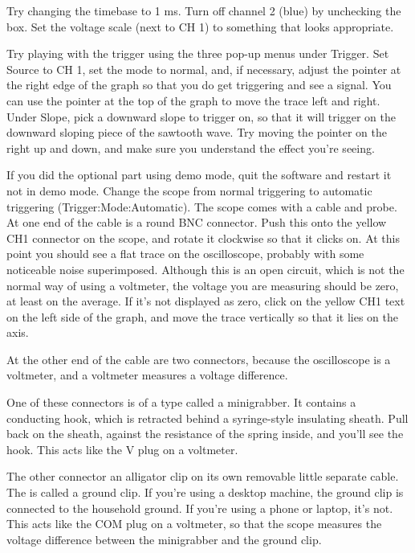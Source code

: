 Try changing the timebase to 1 ms. Turn off channel 2 (blue) by unchecking the
box. Set the voltage scale (next to CH 1) to something that looks appropriate.

Try playing with the trigger using the three pop-up menus under Trigger.
Set Source to CH 1, set the mode to normal, and, if necessary, adjust the
pointer at the right edge of the graph so that you do get triggering and
see a signal. You can use the pointer at the top of the graph to move the
trace left and right. Under Slope, pick a downward slope to trigger on, so
that it will trigger on the downward sloping piece of the sawtooth wave.
Try moving the pointer on the right up and down, and make sure you understand
the effect you're seeing.


If you did the optional part using demo mode, quit the software and restart it not
in demo mode.
Change the scope from normal triggering to automatic triggering (Trigger:Mode:Automatic).
The scope comes with a cable and probe. At one end of the cable is a round BNC
connector. Push this onto the yellow CH1 connector on the scope, and rotate it
clockwise so that it clicks on. 
At this point you should see a flat trace on the oscilloscope, probably with some
noticeable noise superimposed.
Although this is an open circuit, which is not the normal way of using a voltmeter,
the voltage you are measuring should be zero, at least on the average. If it's
not displayed as zero, click on the yellow CH1 text on the left side of the graph,
and move the trace vertically so that it lies on the axis.

At the other end of the cable are two
connectors, because the oscilloscope is a voltmeter, and a voltmeter measures
a voltage difference.

One of these connectors is of a type called a minigrabber.  It
contains a conducting hook, which is retracted behind a syringe-style
insulating sheath. Pull back on the sheath, against the resistance of
the spring inside, and you'll see the hook.  This acts like the V plug
on a voltmeter.

The other connector an alligator clip on its own removable little separate cable. The is called a ground
clip. If you're using a desktop machine, the ground clip
is connected to the household ground. If you're using a phone or laptop, it's not.
This acts like the COM plug on a voltmeter, so that the scope measures the voltage
difference between the minigrabber and the ground clip.

